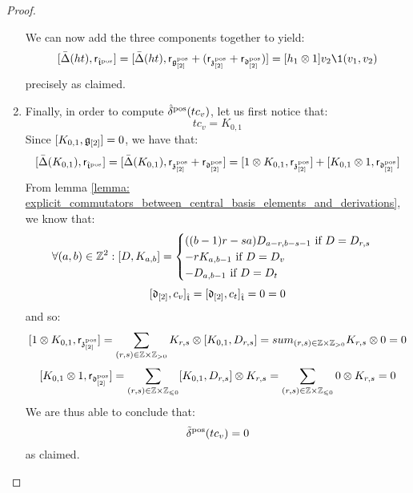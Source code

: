 \begin{proof}
\begin{enumerate}
                    We can now add the three components together to yield:
                        $$[\bar{\Delta}(ht), \sfr_{\extendedtoroidal^{\positive}}] = [ \bar{\Delta}(ht), \sfr_{\g_{[2]}^{\positive}} + (\sfr_{\z_{[2]}^{\positive}} + \sfr_{\d_{[2]}^{\positive}}) ] =  [h_1 \tensor 1] v_2 \1(v_1, v_2)$$
                    precisely as claimed. 
                    
                    \item Finally, in order to compute $\hat{\delta}^{\mathrm{pos}}(t c_v)$, let us first notice that:
                        $$t c_v = K_{0, 1}$$
                    Since $[K_{0, 1}, \mathfrak{g}_{[2]}] = 0$, we have that:
                        $$[\bar{\Delta}(K_{0, 1}), \sfr_{\extendedtoroidal^{\positive}}] = [\bar{\Delta}(K_{0, 1}), \sfr_{\z_{[2]}^{\positive}} + \sfr_{\d_{[2]}^{\positive}}] = [1 \tensor K_{0, 1}, \sfr_{\z_{[2]}^{\positive}}] + [K_{0, 1} \tensor 1, \sfr_{\d_{[2]}^{\positive}}]$$
                    From lemma \ref{lemma: explicit_commutators_between_central_basis_elements_and_derivations}, we know that:
                        $$
                            \forall (a, b) \in \mathbb{Z}^2: [D, K_{a, b}] =
                            \begin{cases}
                                \text{$((b - 1)r - sa) D_{a - r, b - s - 1}$ if $D = D_{r, s}$}
                                \\
                                \text{$-r K_{a, b - 1}$ if $D = D_v$}
                                \\
                                \text{$- D_{a, b - 1}$ if $D = D_t$}
                            \end{cases}
                        $$
                        $$[\mathfrak{d}_{[2]}, c_v]_{\hat{\mathfrak{t}}} = [\mathfrak{d}_{[2]}, c_t]_{\hat{\mathfrak{t}}} = 0 = 0$$
                    and so:
                        $$[1 \tensor K_{0, 1}, \sfr_{\z_{[2]}^{\positive}}] = \sum_{(r, s) \in \Z \x \Z_{> 0}} K_{r, s} \tensor [K_{0, 1}, D_{r, s}] = sum_{(r, s) \in \Z \x \Z_{> 0}} K_{r, s} \tensor 0 = 0$$
                        $$[K_{0, 1} \tensor 1, \sfr_{\d_{[2]}^{\positive}}] = \sum_{(r, s) \in \Z \x \Z_{\leq 0}} [K_{0, 1}, D_{r, s}] \tensor K_{r, s} = \sum_{(r, s) \in \Z \x \Z_{\leq 0}} 0 \tensor K_{r, s} = 0$$
                    We are thus able to conclude that:
                        $$\tilde{\delta}^{\mathrm{pos}}(t c_v) = 0$$
                    as claimed.
                \end{enumerate}
            \end{proof}
    
